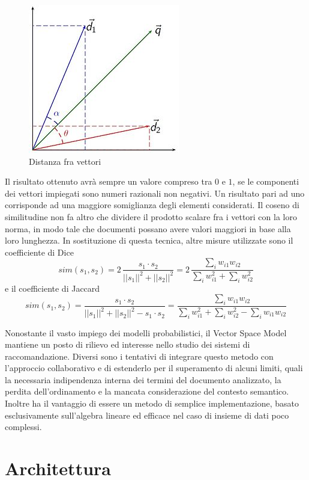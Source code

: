 \documentclass[Lau,binding=0.6cm,noexaminfo,oneside]{sapthesis}
\begin{document}
\begin{figure}[!ht]
  \centering
  \includegraphics[scale=0.9]{vsm.jpg}
  \caption{Distanza fra vettori}
\end{figure}

Il risultato ottenuto avrà sempre un valore compreso tra $0$ e $1$, se le componenti dei vettori impiegati sono numeri razionali non negativi. Un risultato pari ad uno corrisponde ad una maggiore somiglianza degli elementi considerati. Il coseno di similitudine non fa altro che dividere il prodotto scalare fra i vettori con la loro norma, in modo tale che documenti possano avere valori maggiori in base alla loro lunghezza. In sostituzione di questa tecnica, altre misure utilizzate sono il coefficiente di Dice
\[
sim(s_1, s_2) = 2 \, \frac{s_1 \cdot s_2}{||s_1||^2 + ||s_2||^2} = 2 \, \frac{\sum_{i} w_{i1} w_{i2}}{\sum_{i} w_{i1}^2 + \sum_{i} w_{i2}^2}
\]
e il coefficiente di Jaccard
\[
sim(s_1, s_2) = \frac{s_1 \cdot s_2}{||s_1||^2 + ||s_2||^2 - s_1 \cdot s_2} = \frac{\sum_{i} w_{i1} w_{i2}}{\sum_{i} w_{i1}^2 + \sum_{i} w_{i2}^2 - \sum_{i} w_{i1} w_{i2}}
\]

\medskip

Nonostante il vasto impiego dei modelli probabilistici, il Vector Space Model mantiene un posto di rilievo ed interesse nello studio dei sistemi di raccomandazione. Diversi sono i tentativi di integrare questo metodo con l'approccio collaborativo e di estenderlo per il superamento di alcuni limiti, quali la necessaria indipendenza interna dei termini del documento analizzato, la perdita dell'ordinamento e la mancata considerazione del contesto semantico. Inoltre ha il vantaggio di essere un metodo di semplice implementazione, basato esclusivamente sull'algebra lineare ed efficace nel caso di insieme di dati poco complessi.

\chapter{Architettura}
\end{document}
